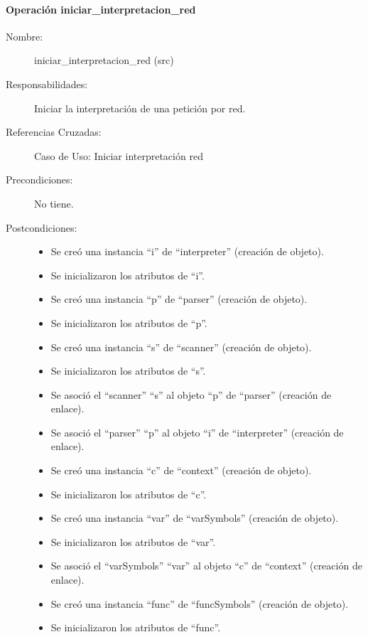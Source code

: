 \paragraph{Operación iniciar\_interpretacion\_red}
\FloatBarrier
\begin{framed}
	\begin{description}
		\item [Nombre:] iniciar\_interpretacion\_red (src)
		\item [Responsabilidades:] Iniciar la interpretación de una petición por red.
		\item [Referencias Cruzadas: ] Caso de Uso: Iniciar interpretación red
      \item [Precondiciones:] No tiene.
      \item [Postcondiciones:] \hfill
      \begin {itemize}
         \item Se creó una instancia ``i'' de ``interpreter'' (creación de objeto).
         \item Se inicializaron los atributos de ``i''.
         \item Se creó una instancia ``p'' de ``parser'' (creación de objeto).
         \item Se inicializaron los atributos de ``p''.
         \item Se creó una instancia ``s'' de ``scanner'' (creación de objeto).
         \item Se inicializaron los atributos de ``s''.
         \item Se asoció el ``scanner'' ``s'' al objeto ``p'' de ``parser'' (creación de enlace).
         \item Se asoció el ``parser'' ``p'' al objeto ``i'' de ``interpreter'' (creación de enlace).
         \item Se creó una instancia ``c'' de ``context'' (creación de objeto).
         \item Se inicializaron los atributos de ``c''.
         \item Se creó una instancia ``var'' de ``varSymbols'' (creación de objeto).
         \item Se inicializaron los atributos de ``var''.
         \item Se asoció el ``varSymbols'' ``var'' al objeto ``c'' de ``context'' (creación de enlace).
         \item Se creó una instancia ``func'' de ``funcSymbols'' (creación de objeto).
         \item Se inicializaron los atributos de ``func''.

\end{itemize}
\end{description}
\end{framed}
